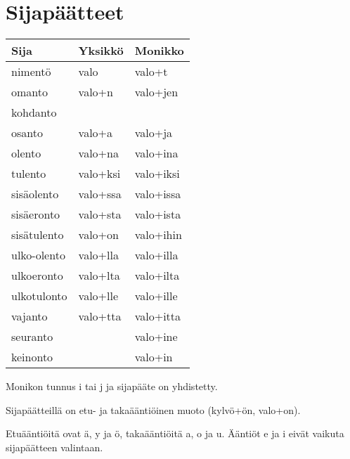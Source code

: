 \section{Sijapäätteet}


\begin{tabular}{@{}|l|l|l|} \hline
Sija        & Yksikkö  & Monikko \\ \hline
nimentö     & valo     & valo+t \\
omanto      & valo+n   & valo+jen \\
kohdanto    &          & \\
osanto      & valo+a   & valo+ja \\
olento      & valo+na  & valo+ina \\
tulento     & valo+ksi & valo+iksi \\
sisäolento  & valo+ssa & valo+issa \\
sisäeronto  & valo+sta & valo+ista \\
sisätulento & valo+on  & valo+ihin \\
ulko-olento & valo+lla & valo+illa \\
ulkoeronto  & valo+lta & valo+ilta \\
ulkotulonto & valo+lle & valo+ille \\
vajanto     & valo+tta & valo+itta \\
seuranto    &          & valo+ine \\
keinonto    &          & valo+in \\ \hline
\end{tabular}
\bigskip

Monikon tunnus i tai j ja sijapääte on yhdistetty.

Sijapäätteillä on etu- ja takaääntiöinen muoto (kylvö+ön, valo+on).

Etuääntiöitä ovat ä, y ja ö, takaääntiöitä a, o ja u.
Ääntiöt e ja i eivät vaikuta sijapäätteen valintaan.

\bigskip


